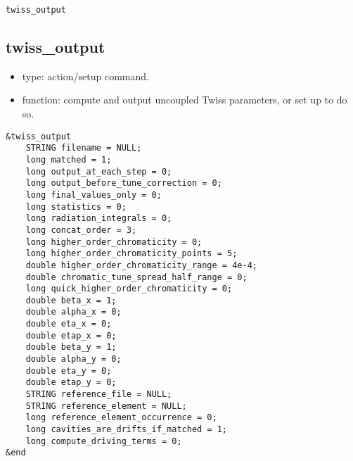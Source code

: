 \documentclass[11pt]{article}
\begin{document}
\begin{latexonly}
\newpage
\begin{center}{\Large\verb|twiss_output|}\end{center}
\end{latexonly}
\subsection{twiss\_output \label{subsec:twissoutput}}

\begin{itemize}
\item type: action/setup command.
\item function: compute and output uncoupled Twiss parameters, or set up to do so.
\end{itemize}

\begin{verbatim}
&twiss_output
    STRING filename = NULL;
    long matched = 1;
    long output_at_each_step = 0;
    long output_before_tune_correction = 0;
    long final_values_only = 0;
    long statistics = 0;
    long radiation_integrals = 0;
    long concat_order = 3;
    long higher_order_chromaticity = 0;
    long higher_order_chromaticity_points = 5;
    double higher_order_chromaticity_range = 4e-4;
    double chromatic_tune_spread_half_range = 0;
    long quick_higher_order_chromaticity = 0;
    double beta_x = 1;
    double alpha_x = 0;
    double eta_x = 0;
    double etap_x = 0;
    double beta_y = 1;
    double alpha_y = 0;
    double eta_y = 0;
    double etap_y = 0;
    STRING reference_file = NULL;
    STRING reference_element = NULL;
    long reference_element_occurrence = 0;
    long cavities_are_drifts_if_matched = 1;
    long compute_driving_terms = 0;
&end
\end{verbatim}
\end{document}
